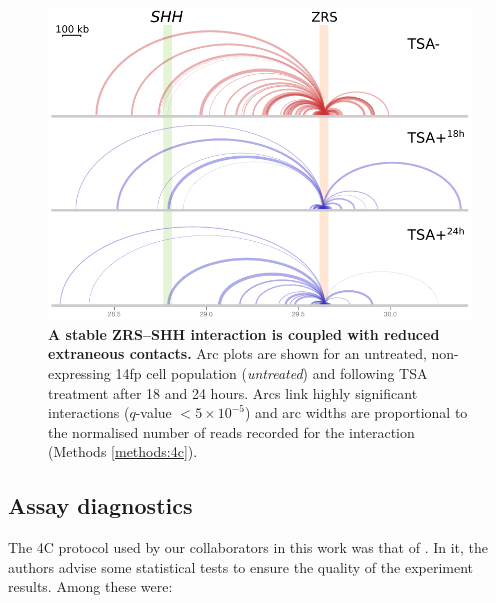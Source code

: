 \documentclass[a4paper,11pt,oneside]{book}
\begin{document}
\begin{figure}
\begin{center} 
\includegraphics[width=5in]{figs/4c_arcs.pdf}
\captionsetup{width=\textwidth} 
\caption[ A stable ZRS--SHH interaction is coupled with reduced extraneous contacts. ]{ {\bf A stable ZRS--SHH interaction is coupled with reduced extraneous contacts. }
Arc plots are shown for an untreated, non-expressing 14fp cell population (\emph{untreated}) and following TSA treatment after 18 and 24 hours. Arcs link highly significant interactions ($q$-value $< 5 \times 10^{-5}$) and arc widths are proportional to the normalised number of reads recorded for the interaction (Methods \ref{methods:4c}).
}\label{fig:4carcs}
\end{center} 
\end{figure} 

%

\subsection{Assay diagnostics}

The 4C protocol used by our collaborators in this work was that of \citet{Stadhouders2013}. In it, the authors advise some statistical tests to ensure the quality of the experiment results. Among these were:\cite{Stadhouders2013}
\end{document}
